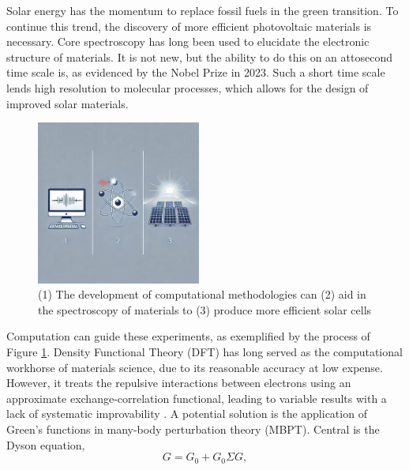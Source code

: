 Solar energy has the momentum to replace fossil fuels in the green transition. To continue this trend, the discovery of more efficient photovoltaic materials is necessary. Core spectroscopy has long been used to elucidate the electronic structure of materials. It is not new, but the ability to do this on an attosecond time scale is, as evidenced by the Nobel Prize in 2023. Such a short time scale lends high resolution to molecular processes, which allows for the design of improved solar materials. 
\begin{figure}
   \centering
   \includegraphics[width=0.48\textwidth]{picture.png}
   \caption{(1) The development of computational methodologies can (2) aid in the spectroscopy of materials to (3) produce more efficient solar cells}
   \label{fig:fig1}
\end{figure}
Computation can guide these experiments, as exemplified by the process of Figure \ref{fig:fig1}. Density Functional Theory (DFT) has long served as the computational workhorse of materials science, due to its reasonable accuracy at low expense. However, it treats the repulsive interactions between electrons using an approximate exchange-correlation functional, leading to variable results with a lack of systematic improvability \cite{kozlowski_elucidating_2021}. A potential solution is the application of Green's functions in many-body perturbation theory (MBPT). Central is the Dyson equation,
\begin{equation}
G = G_0 + G_0 \Sigma G,
\label{eqn:dyson}
\end{equation}
